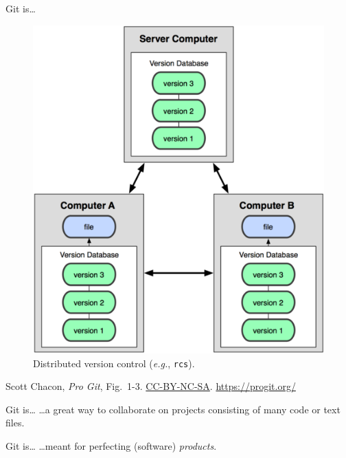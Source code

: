 \begin{frame}{Git is\ldots}
  \begin{figure}
    \includegraphics[scale=0.8]{18333fig0103-tn.png}
    \\ Distributed version control (\emph{e.g.}, \texttt{rcs}).
  \end{figure}
  \footnotesize{Scott Chacon,
    \emph{Pro Git},
    Fig.~1-3.
    \href{https://creativecommons.org/licenses/by-nc-sa/3.0/legalcode}{CC-BY-NC-SA}.
    \href{https://progit.org/}{https://progit.org/}}

\end{frame}

\begin{frame}{Git is\ldots}
  \hangindent=26pt \huge {
  \ldots a great way to collaborate on projects consisting of
    many code or text files.
  }
\end{frame}

\begin{frame}{Git is\ldots}
  \hangindent=26pt \huge {
  \ldots meant for perfecting (software) \emph{products}.
  }
\end{frame}

